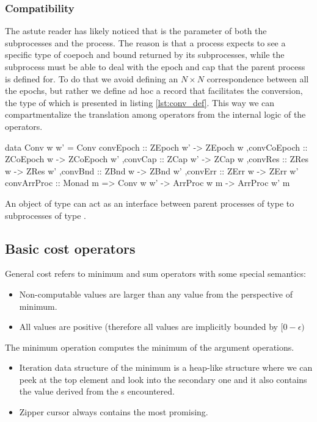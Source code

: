 \subsubsection{Compatibility}

The astute reader has likely noticed that  is the parameter of
both the subprocesses and the process. The reason is that a process
expects to see a specific type of coepoch and bound returned by its
subprocesses, while the subprocess must be able to deal with the epoch
and cap that the parent process is defined for. To do that we avoid
defining an \(N \times N\) correspondence between all the epochs, but
rather we define ad hoc a record that facilitates the conversion, the
type of which is presented in listing \ref{lst:conv_def}. This way we
can compartmentalize the translation among operators from the internal
logic of the operators.

\begin{code}
\begin{haskellcode}
data Conv w w' =
  Conv
  { convEpoch :: ZEpoch w' -> ZEpoch w
   ,convCoEpoch :: ZCoEpoch w -> ZCoEpoch w'
   ,convCap :: ZCap w' -> ZCap w
   ,convRes :: ZRes w -> ZRes w'
   ,convBnd :: ZBnd w -> ZBnd w'
   ,convErr :: ZErr w -> ZErr w'
  }
convArrProc :: Monad m => Conv w w' -> ArrProc w m -> ArrProc w' m
\end{haskellcode}
\label{lst:conv_def}
\caption{An object of type  can act as an interface
  between parent processes of type  to subprocesses of type
  .}
\end{code}


\subsection{Basic cost operators}
\label{sec:basic_cost_ops}

General cost refers to minimum and sum operators with some special
semantics:

\begin{itemize}
\item Non-computable values are larger than any value from the
  perspective of minimum.
\item All values are positive (therefore all values are implicitly
  bounded by \([0 - \epsilon)\)
\end{itemize}

The minimum operation computes the minimum of the argument
operations.

\begin{itemize}
\item Iteration data structure of the minimum is a heap-like structure
  where we can peek at the top element and look into the secondary one
  and it also contains the value derived from the s encountered.
\item Zipper cursor always contains the most promising.
\end{itemize}

